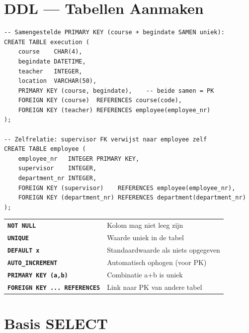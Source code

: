 \documentclass[10pt,a4paper]{article}
\begin{document}
\section{DDL --- Tabellen Aanmaken}

\begin{tcolorbox}[sqlbox,title=Structuur + constraints]
\begin{lstlisting}
-- Samengestelde PRIMARY KEY (course + begindate SAMEN uniek):
CREATE TABLE execution (
    course    CHAR(4),
    begindate DATETIME,
    teacher   INTEGER,
    location  VARCHAR(50),
    PRIMARY KEY (course, begindate),    -- beide samen = PK
    FOREIGN KEY (course)  REFERENCES course(code),
    FOREIGN KEY (teacher) REFERENCES employee(employee_nr)
);

-- Zelfrelatie: supervisor FK verwijst naar employee zelf
CREATE TABLE employee (
    employee_nr   INTEGER PRIMARY KEY,
    supervisor    INTEGER,
    department_nr INTEGER,
    FOREIGN KEY (supervisor)    REFERENCES employee(employee_nr),
    FOREIGN KEY (department_nr) REFERENCES department(department_nr)
);
\end{lstlisting}
\end{tcolorbox}

\begin{tcolorbox}[notebox,title=Constraints samengevat]
{\footnotesize\begin{tabular}{ll}
\texttt{\textcolor{sqlpurple}{\bfseries NOT NULL}} & Kolom mag niet leeg zijn \\
\texttt{\textcolor{sqlpurple}{\bfseries UNIQUE}} & Waarde uniek in de tabel \\
\texttt{\textcolor{sqlpurple}{\bfseries DEFAULT x}} & Standaardwaarde als niets opgegeven \\
\texttt{\textcolor{sqlpurple}{\bfseries AUTO\_INCREMENT}} & Automatisch ophogen (voor PK) \\
\texttt{\textcolor{sqlpurple}{\bfseries PRIMARY KEY (a,b)}} & Combinatie a+b is uniek \\
\texttt{\textcolor{sqlpurple}{\bfseries FOREIGN KEY ... REFERENCES}} & Link naar PK van andere tabel \\
\end{tabular}}
\end{tcolorbox}

\section{Basis SELECT}
\end{document}
